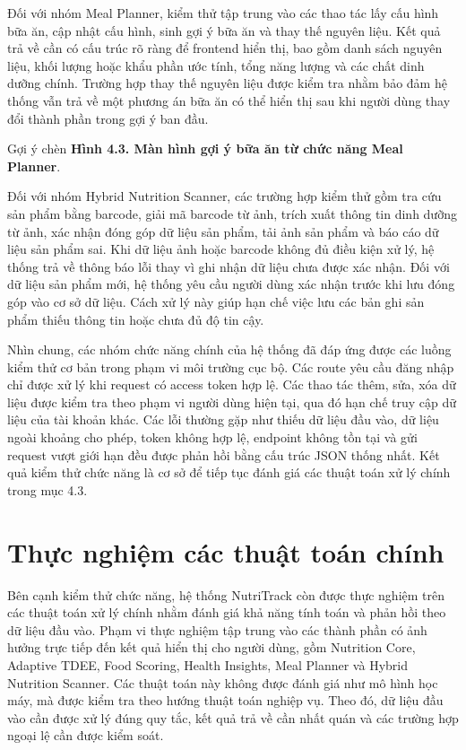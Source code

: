 \documentclass[12pt, a4paper]{report}
\begin{document}
Đối với nhóm Meal Planner, kiểm thử tập trung vào các thao tác lấy cấu hình bữa ăn, cập nhật cấu hình, sinh gợi ý bữa ăn và thay thế nguyên liệu. Kết quả trả về cần có cấu trúc rõ ràng để frontend hiển thị, bao gồm danh sách nguyên liệu, khối lượng hoặc khẩu phần ước tính, tổng năng lượng và các chất dinh dưỡng chính. Trường hợp thay thế nguyên liệu được kiểm tra nhằm bảo đảm hệ thống vẫn trả về một phương án bữa ăn có thể hiển thị sau khi người dùng thay đổi thành phần trong gợi ý ban đầu.

Gợi ý chèn \textbf{Hình 4.3. Màn hình gợi ý bữa ăn từ chức năng Meal Planner}.

Đối với nhóm Hybrid Nutrition Scanner, các trường hợp kiểm thử gồm tra cứu sản phẩm bằng barcode, giải mã barcode từ ảnh, trích xuất thông tin dinh dưỡng từ ảnh, xác nhận đóng góp dữ liệu sản phẩm, tải ảnh sản phẩm và báo cáo dữ liệu sản phẩm sai. Khi dữ liệu ảnh hoặc barcode không đủ điều kiện xử lý, hệ thống trả về thông báo lỗi thay vì ghi nhận dữ liệu chưa được xác nhận. Đối với dữ liệu sản phẩm mới, hệ thống yêu cầu người dùng xác nhận trước khi lưu đóng góp vào cơ sở dữ liệu. Cách xử lý này giúp hạn chế việc lưu các bản ghi sản phẩm thiếu thông tin hoặc chưa đủ độ tin cậy.

Nhìn chung, các nhóm chức năng chính của hệ thống đã đáp ứng được các luồng kiểm thử cơ bản trong phạm vi môi trường cục bộ. Các route yêu cầu đăng nhập chỉ được xử lý khi request có access token hợp lệ. Các thao tác thêm, sửa, xóa dữ liệu được kiểm tra theo phạm vi người dùng hiện tại, qua đó hạn chế truy cập dữ liệu của tài khoản khác. Các lỗi thường gặp như thiếu dữ liệu đầu vào, dữ liệu ngoài khoảng cho phép, token không hợp lệ, endpoint không tồn tại và gửi request vượt giới hạn đều được phản hồi bằng cấu trúc JSON thống nhất. Kết quả kiểm thử chức năng là cơ sở để tiếp tục đánh giá các thuật toán xử lý chính trong mục 4.3.

\section{Thực nghiệm các thuật toán chính}Bên cạnh kiểm thử chức năng, hệ thống NutriTrack còn được thực nghiệm trên các thuật toán xử lý chính nhằm đánh giá khả năng tính toán và phản hồi theo dữ liệu đầu vào. Phạm vi thực nghiệm tập trung vào các thành phần có ảnh hưởng trực tiếp đến kết quả hiển thị cho người dùng, gồm Nutrition Core, Adaptive TDEE, Food Scoring, Health Insights, Meal Planner và Hybrid Nutrition Scanner. Các thuật toán này không được đánh giá như mô hình học máy, mà được kiểm tra theo hướng thuật toán nghiệp vụ. Theo đó, dữ liệu đầu vào cần được xử lý đúng quy tắc, kết quả trả về cần nhất quán và các trường hợp ngoại lệ cần được kiểm soát.
\end{document}
